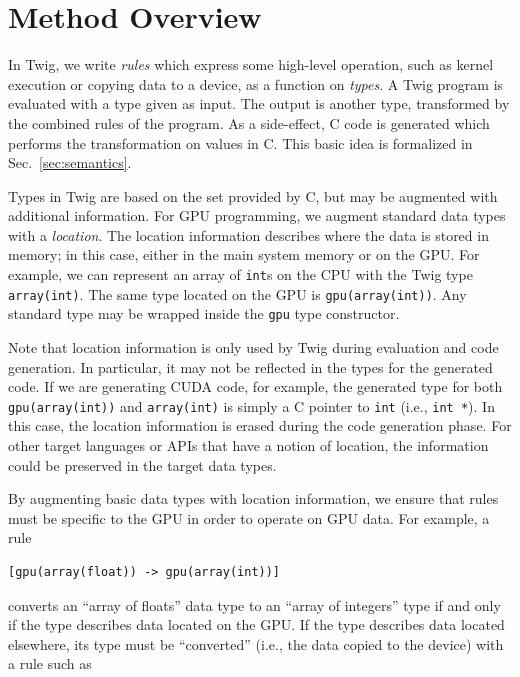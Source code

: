 
\section{Method Overview}

In Twig, we write \emph{rules} which express some high-level operation, such as kernel execution or copying data to a device, as a function on \emph{types}. A Twig program is evaluated with a type given as input. The output is another type, transformed by the combined rules of the program. As a side-effect, C code is generated which performs the transformation on values in C. This basic idea is formalized in Sec.~\ref{sec:semantics}.

Types in Twig are based on the set provided by C, but may be augmented with additional information. For GPU programming, we augment standard data types with a \emph{location}. The location information describes where the data is stored in memory; in this case, either in the main system memory or on the GPU. For example, we can represent an array of \texttt{int}s on the CPU with the Twig type \texttt{array(int)}. The same type located on the GPU is \texttt{gpu(array(int))}. Any standard type may be wrapped inside the \texttt{gpu} type constructor.

Note that location information is only used by Twig during evaluation and code generation. In particular, it may not be reflected in the types for the generated code. If we are generating CUDA code, for example, the generated type for both \texttt{gpu(array(int))} and \texttt{array(int)} is simply a C pointer to \texttt{int} (i.e., \texttt{int *}). In this case, the location information is erased during the code generation phase. For other target languages or APIs that have a notion of location, the information could be preserved in the target data types.

By augmenting basic data types with location information, we ensure that rules must be specific to the GPU in order to operate on GPU data. For example, a rule

\begin{verbatim}
[gpu(array(float)) -> gpu(array(int))]
\end{verbatim}

converts an ``array of floats'' data type to an ``array of integers'' type if and only if the type describes data located on the GPU. If the type describes data located elsewhere, its type must be ``converted'' (i.e., the data copied to the device) with a rule such as

